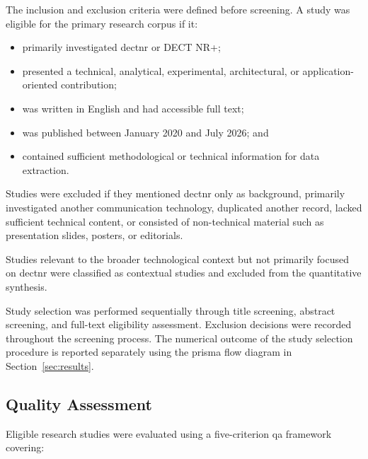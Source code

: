 The inclusion and exclusion criteria were defined before screening. A study was eligible for the primary research corpus if it:

\begin{itemize}

    \item primarily investigated \gls{dectnr} or DECT NR+;

    \item presented a technical, analytical, experimental, architectural, or     application-oriented contribution;

    \item was written in English and had accessible full text;

    \item was published between January 2020 and July 2026; and

    \item contained sufficient methodological or technical information for     data extraction.

\end{itemize}

Studies were excluded if they mentioned \gls{dectnr} only as background, primarily investigated another communication technology, duplicated another record, lacked sufficient technical content, or consisted of non-technical material such as presentation slides, posters, or editorials.

Studies relevant to the broader technological context but not primarily focused on \gls{dectnr} were classified as contextual studies and excluded from the quantitative synthesis.

Study selection was performed sequentially through title screening, abstract screening, and full-text eligibility assessment. Exclusion decisions were recorded throughout the screening process. The numerical outcome of the study selection procedure is reported separately using the \gls{prisma} flow diagram in Section~\ref{sec:results}.

\subsection{Quality Assessment}
\label{subsec:quality_assessment}

Eligible research studies were evaluated using a five-criterion \gls{qa} framework covering:

